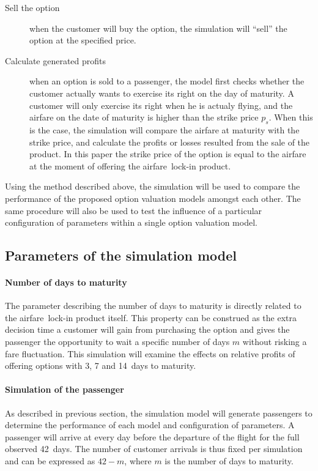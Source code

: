 \begin{description}
\item[Sell the option] when the customer will buy the option, the simulation will ``sell'' the option at the specified price.
\item[Calculate generated profits] when an option is sold to a passenger, the model first checks whether the customer actually wants to exercise its right on the day of maturity. A customer will only exercise its right when he is actualy flying, and the airfare on the date of maturity is higher than the strike price $p_s$. When this is the case, the simulation will compare the airfare at maturity with the strike price, and calculate the profits or losses resulted from the sale of the product. In this paper the strike price of the option is equal to the airfare at the moment of offering the airfare~lock-in product.
\end{description}

Using the method described above, the simulation will be used to compare the performance of the proposed option valuation models amongst each other. The same procedure will also be used to test the influence of a particular configuration of parameters within a single option valuation model.

\subsection{Parameters of the simulation model}


\paragraph{Number of days to maturity}
The parameter describing the number of days to maturity is directly related to the airfare~lock-in product itself. This property can be construed as the extra decision time a customer will gain from purchasing the option and gives the passenger the opportunity to wait a specific number of days $m$ without risking a fare fluctuation. This simulation will examine the effects on relative profits of offering options with 3, 7 and 14~days to maturity.


\paragraph{Simulation of the passenger}
As described in previous section, the simulation model will generate passengers to determine the performance of each model and configuration of parameters. A passenger will arrive at every day before the departure of the flight for the full observed 42~days. The number of customer arrivals is thus fixed per simulation and can be expressed as $42 - m$, where $m$ is the number of days to maturity.




